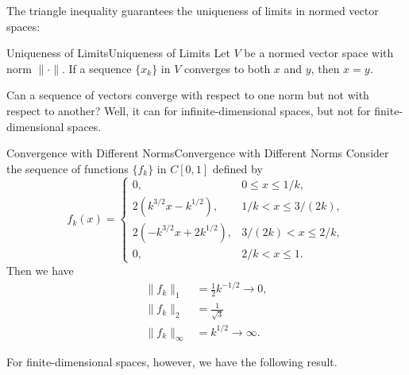 \documentclass[../main.tex]{subfiles}
\begin{document}
The triangle inequality guarantees the uniqueness of limits in normed vector spaces:
\begin{proposition}{Uniqueness of Limits}{Uniqueness of Limits}
  Let $V$ be a normed vector space with norm $\|\cdot\|$. If a sequence $\{x_k\}$ in $V$ converges to both $x$ and $y$, then $x = y$.
\end{proposition}


Can a sequence of vectors converge with respect to one norm but not with respect to another? Well, it can for infinite-dimensional spaces, but not for finite-dimensional spaces.

\begin{example}{Convergence with Different Norms}{Convergence with Different Norms}
  Consider the sequence of functions $\{f_k\}$ in $C[0, 1]$ defined by
  \begin{equation*}
    f_k(x) =
    \begin{cases}
      0, & 0 \leq x \leq 1 / k, \\
      2(k^{3 / 2}x - k^{1 / 2}), & 1 / k < x \leq 3 / (2k), \\
      2(-k^{3 / 2}x + 2k^{1 / 2}), & 3 / (2k) < x \leq 2 / k, \\
      0, & 2 / k < x \leq 1.
    \end{cases}
  \end{equation*}
  Then we have
  \begin{equation*}
    \begin{aligned}
      \|f_k\|_1 & = \frac{1}{2} k^{-1 / 2} \to 0, \\
      \|f_k\|_2 & = \frac{1}{\sqrt{3}} \\
      \|f_k\|_\infty & = k^{1 / 2} \to \infty.
    \end{aligned}
  \end{equation*}
\end{example}

For finite-dimensional spaces, however, we have the following result.
\end{document}
